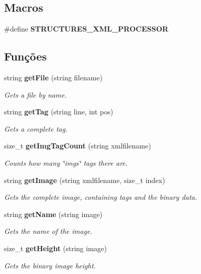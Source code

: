 \subsection*{Macros}
\begin{DoxyCompactItemize}
\item 
\#define \textbf{ S\+T\+R\+U\+C\+T\+U\+R\+E\+S\+\_\+\+X\+M\+L\+\_\+\+P\+R\+O\+C\+E\+S\+S\+OR}
\end{DoxyCompactItemize}
\subsection*{Funções}
\begin{DoxyCompactItemize}
\item 
string \textbf{ get\+File} (string filename)
\begin{DoxyCompactList}\small\item\em Gets a file by name. \end{DoxyCompactList}\item 
string \textbf{ get\+Tag} (string line, int pos)
\begin{DoxyCompactList}\small\item\em Gets a complete tag. \end{DoxyCompactList}\item 
size\+\_\+t \textbf{ get\+Img\+Tag\+Count} (string xmlfilename)
\begin{DoxyCompactList}\small\item\em Counts how many \char`\"{}imgs\char`\"{} tags there are. \end{DoxyCompactList}\item 
string \textbf{ get\+Image} (string xmlfilename, size\+\_\+t index)
\begin{DoxyCompactList}\small\item\em Gets the complete image, containing tags and the binary data. \end{DoxyCompactList}\item 
string \textbf{ get\+Name} (string image)
\begin{DoxyCompactList}\small\item\em Gets the name of the image. \end{DoxyCompactList}\item 
size\+\_\+t \textbf{ get\+Height} (string image)
\begin{DoxyCompactList}\small\item\em Gets the binary image height. \end{DoxyCompactList}\item 

\end{DoxyCompactItemize}
